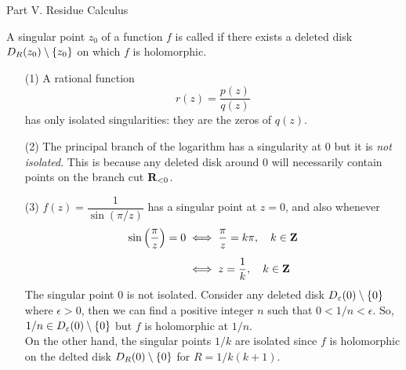 \vspace*{1em}

\begin{mdframed}[backgroundcolor=paleyellow,linewidth=1pt]
\begin{center}
{\sc\Large Part V. Residue Calculus}
\end{center}
\end{mdframed}

\begin{definition}
A singular point $z_0$ of a function $f$ is called  if there exists a deleted disk $D_R(z_0)\setminus\left\{z_0\right\}$ on which $f$ is holomorphic.
\end{definition}

\vspace*{1em}

\begin{example}\hfill
\begin{itemize}[itemsep=1em]
\item[(1)] A rational function
\[r(z) = \frac{p(z)}{q(z)}\]
has only isolated singularities: they are the zeros of $q(z)$.

\item[(2)] The principal branch of the logarithm has a singularity at $0$ but it is \emph{not isolated}. This is because any deleted disk around $0$ will necessarily contain points on the branch cut $\mathbf R_{<0}$.

\item[(3)] $f(z) = \dfrac{1}{\sin(\pi/z)}$ has a singular point at $z = 0$, and also whenever
\begin{align*}
\sin\left(\frac{\pi}{z}\right) = 0 &\iff \frac{\pi}{z} = k\pi,\quad k \in \mathbf Z\\[0.5em]
 &\iff z = \frac{1}{k},\quad k \in \mathbf Z
\end{align*}
The singular point $0$ is not isolated. Consider any deleted disk $D_{\varepsilon}(0)\setminus\left\{0\right\}$ where $\epsilon > 0$, then we can find a positive integer $n$ such that $0 < 1/n < \epsilon$. So, $1/n \in D_{\varepsilon}(0)\setminus\left\{0\right\}$ but $f$ is holomorphic at $1/n$.\\[0.5em]
On the other hand, the singular points $1/k$ are isolated since $f$ is holomorphic on the delted disk $D_R(0)\setminus\left\{0\right\}$ for $R = 1/k(k+1)$. 
\end{itemize}
\end{example}

\vspace*{1em}

